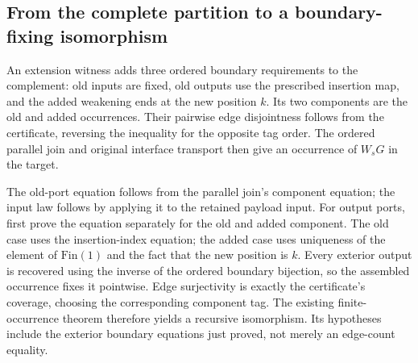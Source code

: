 





\subsection{From the complete partition to a boundary-fixing isomorphism}

An extension witness adds three ordered boundary requirements to the
complement: old inputs are fixed, old outputs use the prescribed insertion
map, and the added weakening ends at the new position $k$. Its two components
are the old and added occurrences. Their pairwise edge disjointness follows
from the certificate, reversing the inequality for the opposite tag order.
The ordered parallel join and original interface transport then give an
occurrence of $W_sG$ in the target.





The old-port equation follows from the parallel join's component equation;
the input law follows by applying it to the retained payload input. For output
ports, first prove the equation separately for the old and added component.
The old case uses the insertion-index equation; the added case uses uniqueness
of the element of $\mathrm{Fin}(1)$ and the fact that the new position is $k$.
Every exterior output is recovered using the inverse of the ordered boundary
bijection, so the assembled occurrence fixes it pointwise. Edge surjectivity
is exactly the certificate's coverage, choosing the corresponding component
tag. The existing finite-occurrence theorem therefore yields a recursive
isomorphism. Its hypotheses include the exterior boundary equations just
proved, not merely an edge-count equality.

